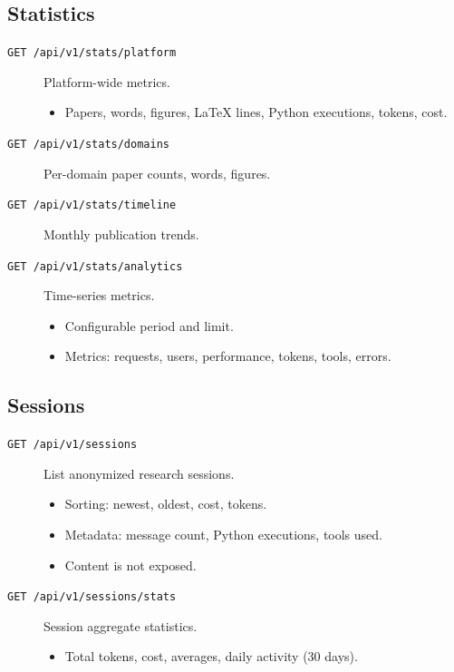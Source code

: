\subsection{Statistics}

\begin{description}
  \item[\texttt{GET /api/v1/stats/platform}] Platform-wide metrics.
  \begin{itemize}
    \item Papers, words, figures, \LaTeX{} lines, Python executions, tokens, cost.
  \end{itemize}

  \item[\texttt{GET /api/v1/stats/domains}] Per-domain paper counts, words, figures.

  \item[\texttt{GET /api/v1/stats/timeline}] Monthly publication trends.

  \item[\texttt{GET /api/v1/stats/analytics}] Time-series metrics.
  \begin{itemize}
    \item Configurable period and limit.
    \item Metrics: requests, users, performance, tokens, tools, errors.
  \end{itemize}
\end{description}

\subsection{Sessions}

\begin{description}
  \item[\texttt{GET /api/v1/sessions}] List anonymized research sessions.
  \begin{itemize}
    \item Sorting: newest, oldest, cost, tokens.
    \item Metadata: message count, Python executions, tools used.
    \item Content is not exposed.
  \end{itemize}

  \item[\texttt{GET /api/v1/sessions/stats}] Session aggregate statistics.
  \begin{itemize}
    \item Total tokens, cost, averages, daily activity (30 days).
  \end{itemize}
\end{description}


